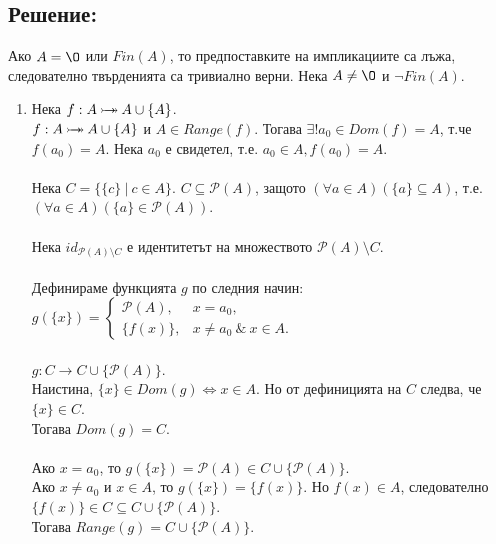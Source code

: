 \documentclass[french]{article}
\begin{document}
	\subsection*{Решение:}
	Ако $A = {\O}$ или $Fin(A)$, то предпоставките на импликациите са лъжа, следователно твърденията са тривиално верни. Нека $A \not= {\O}$ и $\neg Fin(A)$.
	\begin{enumerate}
		\item Нека $f : A \mathbin{\rightarrowtail \hspace{-8pt} \twoheadrightarrow} A \cup \{A\}$. \\
		$f : A \mathbin{\rightarrowtail \hspace{-8pt} \twoheadrightarrow} A \cup \{A\}$ и $A \in Range(f)$. Тогава $\exists ! a_0 \in Dom(f) = A$, т.че $f(a_0) = A$. Нека $a_0$ е свидетел, т.е. $a_0 \in A, f(a_0) = A$. \\
		\\
		Нека $C = \{\{c\}\ |\ c \in A\}$. $C \subseteq \mathcal{P}(A)$, защото $(\forall a \in A)(\{a\} \subseteq A)$, т.е.
		$(\forall a \in A)(\{a\} \in \mathcal{P}(A))$. \\
		\\
		Нека $id_{\mathcal{P}(A) \setminus C}$ е идентитетът на множеството $\mathcal{P}(A) \setminus C$. \\
		\\
		Дефинираме функцията $g$ по следния начин: \\
		$g(\{x\}) = 
		\begin{cases} 
			\mathcal{P}(A), & x = a_0,\ \ \\ 
			\{f(x)\}, & x \not= a_0\ \&\ x \in A.
		\end{cases}$
		\\ \\
		$g : C \to C \cup \{{\mathcal{P}(A)}\}$. \\
		Наистина, $\{x\} \in Dom(g) \Longleftrightarrow x \in A$. Но от дефиницията на $C$ следва, че $\{x\} \in C$. \\
		Тогава $Dom(g) = C$. \\
		\\
		Ако $x = a_0$, то $g(\{x\}) = \mathcal{P}(A) \in C \cup \{{\mathcal{P}(A)}\}$. \\
		Ако $x \not= a_0$ и $x \in A$, то $g(\{x\}) = \{f(x)\}$. Но $f(x) \in A$, следователно $\{f(x)\} \in C \subseteq C \cup \{{\mathcal{P}(A)}\}$. \\
		Тогава $Range(g) = C \cup \{{\mathcal{P}(A)}\}$. \\
		\\

\end{enumerate}
\end{document}

